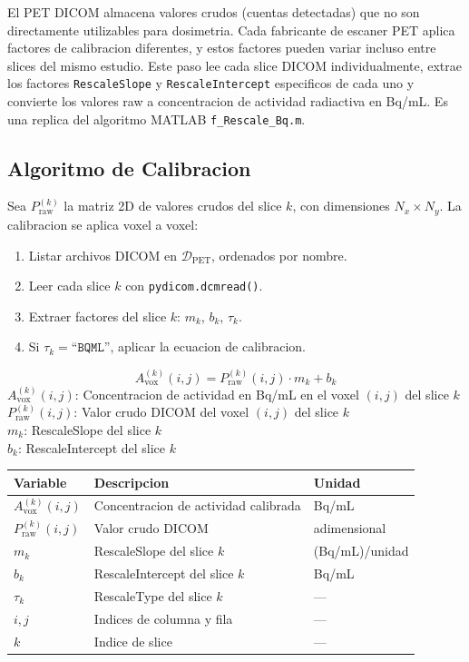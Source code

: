 \documentclass[12pt,a4paper]{article}
\newcommand{\vardef}[2]{\noindent\textbf{#1}: #2\\}
\begin{document}
El PET DICOM almacena valores crudos (cuentas detectadas) que no son directamente utilizables
para dosimetria. Cada fabricante de escaner PET aplica factores de calibracion diferentes, y
estos factores pueden variar incluso entre slices del mismo estudio. Este paso lee cada slice
DICOM individualmente, extrae los factores \texttt{RescaleSlope} y \texttt{RescaleIntercept}
especificos de cada uno y convierte los valores raw a concentracion de actividad radiactiva en
Bq/mL. Es una replica del algoritmo MATLAB \texttt{f\_Rescale\_Bq.m}.

\subsection{Algoritmo de Calibracion}

Sea $P_{\text{raw}}^{(k)}$ la matriz 2D de valores crudos del slice $k$,
con dimensiones $N_x \times N_y$. La calibracion se aplica voxel a voxel:

\begin{enumerate}
    \item Listar archivos DICOM en $\mathcal{D}_{\text{PET}}$, ordenados por nombre.
    \item Leer cada slice $k$ con \texttt{pydicom.dcmread()}.
    \item Extraer factores del slice $k$: $m_k$, $b_k$, $\tau_k$.
    \item Si $\tau_k = \texttt{``BQML''}$, aplicar la ecuacion de calibracion.
\end{enumerate}

\begin{equation}\label{eq:calibracion}
    A_{\text{vox}}^{(k)}(i,j) = P_{\text{raw}}^{(k)}(i,j) \cdot m_k + b_k
\end{equation}
\vardef{$A_{\text{vox}}^{(k)}(i,j)$}{Concentracion de actividad en Bq/mL en el voxel $(i,j)$ del slice $k$}
\vardef{$P_{\text{raw}}^{(k)}(i,j)$}{Valor crudo DICOM del voxel $(i,j)$ del slice $k$}
\vardef{$m_k$}{RescaleSlope del slice $k$}
\vardef{$b_k$}{RescaleIntercept del slice $k$}

\begin{table}[H]
\centering
\begin{tabular}{lll}
\toprule
\textbf{Variable} & \textbf{Descripcion} & \textbf{Unidad} \\
\midrule
$A_{\text{vox}}^{(k)}(i,j)$ & Concentracion de actividad calibrada & Bq/mL \\
$P_{\text{raw}}^{(k)}(i,j)$ & Valor crudo DICOM & adimensional \\
$m_k$ & RescaleSlope del slice $k$ & (Bq/mL)/unidad \\
$b_k$ & RescaleIntercept del slice $k$ & Bq/mL \\
$\tau_k$ & RescaleType del slice $k$ & --- \\
$i, j$ & Indices de columna y fila & --- \\
$k$ & Indice de slice & --- \\
\bottomrule
\end{tabular}
\end{table}
\end{document}
